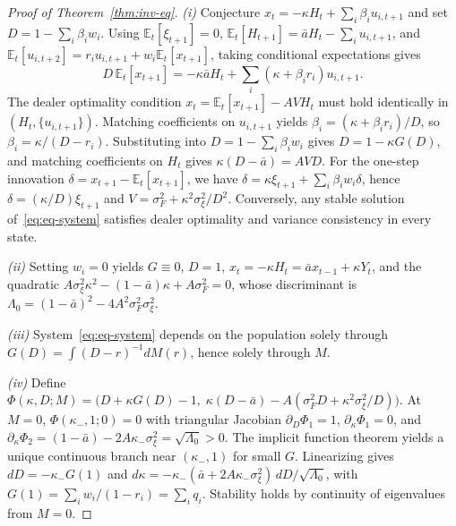 \documentclass[11pt,letterpaper]{article}
\theoremstyle{definition}
\newcommand{\E}{\mathbb{E}}
\begin{document}
\begin{proof}[Proof of Theorem~\ref{thm:inv-eq}]
\emph{(i)} Conjecture $x_t = -\kappa H_t + \sum_i \beta_i u_{i,t+1}$ and set $D = 1 - \sum_i \beta_i w_i$. Using $\E_t[\xi_{t+1}] = 0$, $\E_t[H_{t+1}] = \bar{a} H_t - \sum_i u_{i,t+1}$, and $\E_t[u_{i,t+2}] = r_i u_{i,t+1} + w_i \E_t[x_{t+1}]$, taking conditional expectations gives
\[
  D\, \E_t[x_{t+1}] = -\kappa \bar{a} H_t + \sum_i (\kappa + \beta_i r_i) u_{i,t+1}.
\]
The dealer optimality condition $x_t = \E_t[x_{t+1}] - A V H_t$ must hold identically in $(H_t, \{u_{i,t+1}\})$. Matching coefficients on $u_{i,t+1}$ yields $\beta_i = (\kappa + \beta_i r_i)/D$, so $\beta_i = \kappa / (D - r_i)$. Substituting into $D = 1 - \sum_i \beta_i w_i$ gives $D = 1 - \kappa G(D)$, and matching coefficients on $H_t$ gives $\kappa(D - \bar{a}) = A V D$. For the one-step innovation $\delta = x_{t+1} - \E_t[x_{t+1}]$, we have $\delta = \kappa \xi_{t+1} + \sum_i \beta_i w_i \delta$, hence $\delta = (\kappa/D)\xi_{t+1}$ and $V = \sigma_F^2 + \kappa^2 \sigma_\xi^2 / D^2$. Conversely, any stable solution of~\eqref{eq:eq-system} satisfies dealer optimality and variance consistency in every state.

\emph{(ii)} Setting $w_i = 0$ yields $G \equiv 0$, $D = 1$, $x_t = -\kappa H_t = \bar{a} x_{t-1} + \kappa Y_t$, and the quadratic $A \sigma_\xi^2 \kappa^2 - (1 - \bar{a})\kappa + A \sigma_F^2 = 0$, whose discriminant is $\Lambda_0 = (1 - \bar{a})^2 - 4 A^2 \sigma_F^2 \sigma_\xi^2$.

\emph{(iii)} System~\eqref{eq:eq-system} depends on the population solely through $G(D) = \int (D - r)^{-1} dM(r)$, hence solely through $M$.

\emph{(iv)} Define $\Phi(\kappa, D; M) = \bigl(D + \kappa G(D) - 1,\; \kappa(D - \bar{a}) - A(\sigma_F^2 D + \kappa^2 \sigma_\xi^2 / D)\bigr)$. At $M = 0$, $\Phi(\kappa_-, 1; 0) = 0$ with triangular Jacobian $\partial_D \Phi_1 = 1$, $\partial_\kappa \Phi_1 = 0$, and $\partial_\kappa \Phi_2 = (1 - \bar{a}) - 2 A \kappa_- \sigma_\xi^2 = \sqrt{\Lambda_0} > 0$. The implicit function theorem yields a unique continuous branch near $(\kappa_-, 1)$ for small $G$. Linearizing gives $dD = -\kappa_- G(1)$ and $d\kappa = -\kappa_-(\bar{a} + 2 A \kappa_- \sigma_\xi^2)\, dD / \sqrt{\Lambda_0}$, with $G(1) = \sum_i w_i/(1 - r_i) = \sum_i q_i$. Stability holds by continuity of eigenvalues from $M = 0$.
\end{proof}
\end{document}

